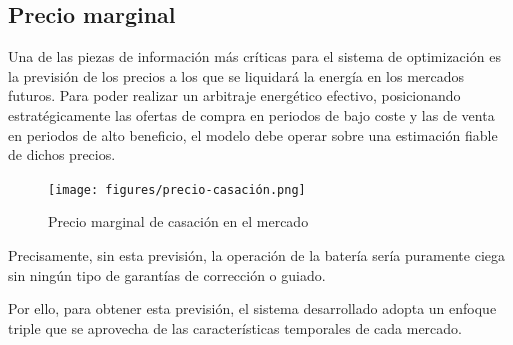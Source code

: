 \subsection{Precio marginal}
\label{makereference4.1.1}

Una de las piezas de información más críticas para el sistema de optimización es la previsión de los precios a los que se liquidará la energía en los mercados futuros. Para poder realizar un arbitraje energético efectivo, posicionando estratégicamente las ofertas de compra en periodos de bajo coste y las de venta en periodos de alto beneficio, el modelo debe operar sobre una estimación fiable de dichos precios.

\begin{figure}
  \centering
  \texttt{[image: figures/precio-casación.png]}
  \caption{Precio marginal de casación en el mercado}
  \label{fig:precio-casación}
\end{figure}

Precisamente, sin esta previsión, la operación de la batería sería puramente ciega sin ningún tipo de garantías de corrección o guiado.

Por ello, para obtener esta previsión, el sistema desarrollado adopta un enfoque triple que se aprovecha de las características temporales de cada mercado.

